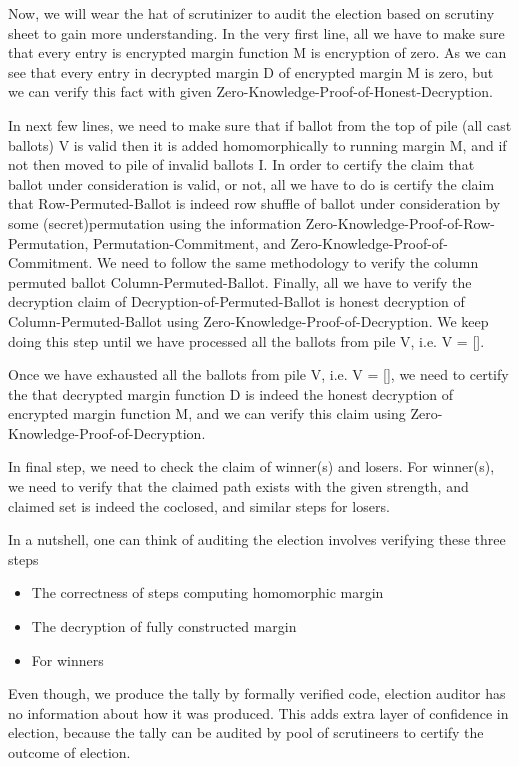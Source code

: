 \documentclass{llncs}
\begin{document}
Now, we will wear the hat of scrutinizer to audit the election based on 
 scrutiny sheet to gain more understanding. In the very first line, all we 
 have to make sure that every entry is encrypted margin function M is encryption 
 of zero. As we can see that every entry in decrypted margin D 
 of encrypted margin M is zero, but we can verify this fact with 
 given Zero-Knowledge-Proof-of-Honest-Decryption.
 
 In next few lines, we need to make sure that if ballot from the top of 
 pile (all cast ballots) V is valid then it is added homomorphically to 
 running margin M, 
 and if not then moved to pile of invalid ballots I. In 
 order to certify the claim that ballot under consideration is valid, 
 or not, all we have to do is certify the claim that Row-Permuted-Ballot 
 is indeed row shuffle of ballot under consideration by 
 some (secret)permutation using the information  
 Zero-Knowledge-Proof-of-Row-Permutation, Permutation-Commitment, and 
 Zero-Knowledge-Proof-of-Commitment. We need to follow the same methodology 
 to verify the column permuted ballot Column-Permuted-Ballot. Finally, 
 all we have to verify the decryption claim of Decryption-of-Permuted-Ballot
 is honest decryption of Column-Permuted-Ballot using 
 Zero-Knowledge-Proof-of-Decryption. We keep doing this step until we have 
 processed all the ballots from pile V, i.e. V = []. 
 
 Once we have exhausted all the ballots from pile V, i.e. V = [], we 
 need to certify the that decrypted margin function D is indeed the 
 honest decryption of encrypted margin function M, and we can 
 verify this claim using Zero-Knowledge-Proof-of-Decryption.
 
 In final step, we need to check the claim of winner(s) and losers. 
 For winner(s), we need to verify that the claimed path exists with 
 the given strength, and claimed set is indeed the coclosed, and similar
 steps for losers.

In a nutshell, one can 
think of auditing the election involves verifying these three steps
\begin{itemize}
 \item The correctness of steps computing homomorphic margin 
 \item The decryption of fully constructed margin
 \item For winners 
\end{itemize} 

Even though, we produce the tally by formally verified code, election 
auditor has no information about how it was produced. This adds extra layer
of confidence in election, because the tally can be audited by pool
of scrutineers to certify the outcome of election.
\end{document}
